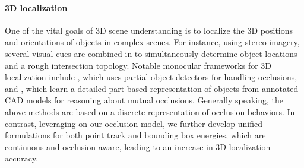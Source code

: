 \paragraph{3D localization}
One of the vital goals of 3D scene understanding is to localize the 3D positions and orientations of objects in complex scenes. For instance, using stereo imagery, several visual cues are combined in \cite{Geiger_etal_2014} to simultaneously determine object locations and a rough intersection topology. Notable monocular frameworks for 3D localization include \cite{Wojek_etal_2013}, which uses partial object detectors for handling occlusions, and \cite{Zia_etal_2013,Zia_etal_2014}, which learn a detailed part-based representation of objects from annotated CAD models for reasoning about mutual occlusions. Generally speaking, the above methods are based on a discrete representation of occlusion behaviors. In contrast, leveraging on our occlusion model, we further develop unified formulations for both point track and bounding box energies, which are continuous and occlusion-aware, leading to an increase in 3D localization accuracy.
